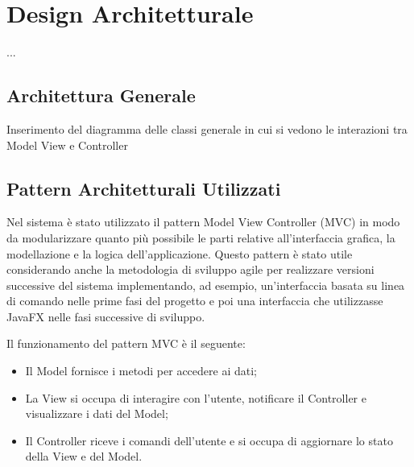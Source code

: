 

\chapter{Design Architetturale}
    ...
    \section{Architettura Generale}
    Inserimento del diagramma delle classi generale in cui si vedono le interazioni tra Model View e Controller
    
    \section{Pattern Architetturali Utilizzati}
        Nel sistema è stato utilizzato il pattern Model View Controller (MVC) in modo da modularizzare quanto più possibile le parti relative all'interfaccia grafica, la modellazione e la logica dell'applicazione. 
        Questo pattern è stato utile considerando anche la metodologia di sviluppo agile per realizzare versioni successive del sistema implementando, ad esempio, un'interfaccia basata su linea di comando nelle prime fasi del progetto e poi una interfaccia che utilizzasse JavaFX nelle fasi successive di sviluppo.
        
        Il funzionamento del pattern MVC è il seguente:
        \begin{itemize}
            \item Il Model fornisce i metodi per accedere ai dati;
            \item La View si occupa di interagire con l'utente, notificare il Controller e visualizzare i dati del Model;
            \item Il Controller riceve i comandi dell'utente e si occupa di aggiornare lo stato della View e del Model.
        \end{itemize}
    
